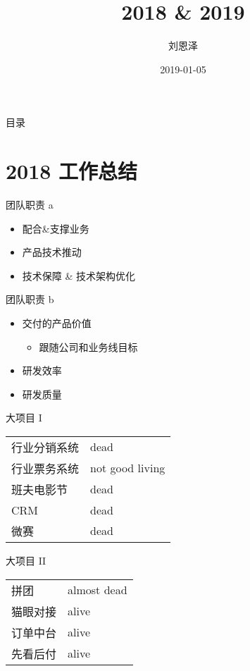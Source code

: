 \documentclass[presentation, bigger]{beamer}
\author{刘恩泽}
\date{2019-01-05}
\title{2018 \& 2019}
\begin{document}
\maketitle
\begin{frame}{目录}
\tableofcontents
\end{frame}


\section{2018 工作总结}
\label{sec:org68e6818}
\begin{frame}[label={sec:org5f7ec27}]{团队职责 a}
\begin{itemize}
\item 配合\&支撑业务
\item 产品技术推动
\item 技术保障 \& 技术架构优化
\end{itemize}
\end{frame}

\begin{frame}[label={sec:org4d59fb4}]{团队职责 b}
\begin{itemize}
\item 交付的产品价值
\begin{itemize}
\item 跟随公司和业务线目标
\end{itemize}
\item 研发效率
\item 研发质量
\end{itemize}
\end{frame}

\begin{frame}[label={sec:org93b57eb}]{大项目 I}
\begin{center}
\begin{tabular}{ll}
\alert{行业分销系统} & dead\\
\alert{行业票务系统} & not good living\\
\alert{班夫电影节} & dead\\
\alert{CRM} & dead\\
\alert{微赛} & dead\\
\end{tabular}
\end{center}
\end{frame}

\begin{frame}[label={sec:org36f2adb}]{大项目 II}
\begin{center}
\begin{tabular}{ll}
\alert{拼团} & almost dead\\
\alert{猫眼对接} & alive\\
\alert{订单中台} & alive\\
\alert{先看后付} & alive\\
\end{tabular}
\end{center}
\end{frame}
\end{document}
